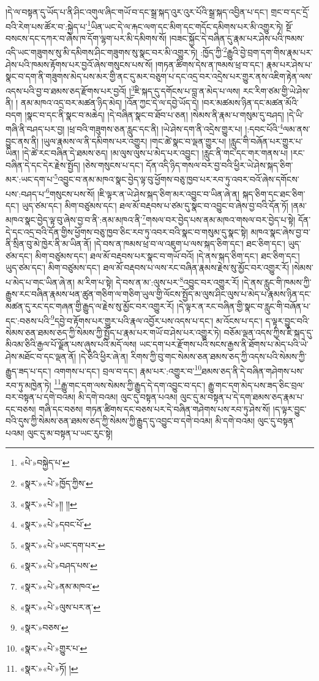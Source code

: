 །དེ་ལ་བསྟན་དུ་ཡོད་པ་ནི་ཤིང་འགུལ་ཞིང་གཡོ་བ་དང་སྒྲ་སྐད་འུར་འུར་པོའི་སྒྲ་སྐད་འབྱིན་པ་དང་། གྲང་བ་དང་དྲོ་བའི་རེག་པས་ཚོར་བ་:སྐྱེད་པ་\footnote{«པེ་»བསྐྱེད་པ་}ཡིན་ཡང་དེ་ལ་རྐང་ལག་དང་མིག་དང་གདོང་དམིགས་པར་མི་འགྱུར་ཏེ། སྔོ་བསངས་དང་དཀར་བ་ཞེས་ཁ་དོག་ལྷག་པར་མི་དམིགས་སོ། །བཟང་སྐྱོང་དེ་བཞིན་དུ་རྣམ་པར་ཤེས་པའི་ཁམས་འདི་ཡང་གཟུགས་སུ་མི་དམིགས་ཤིང་གཟུགས་སུ་སྣང་བར་མི་འགྱུར་ཏེ། :ཁྱོད་ཀྱི་\footnote{«སྣར་»«པེ་»ཁྱོད་ཀྱིས་}རྒྱུའི་བྱེ་བྲག་དག་གིས་རྣམ་པར་ཤེས་པའི་ཁམས་རྟོགས་པར་བྱའོ་ཞེས་གསུངས་པས་སོ། །གཏན་ཚིགས་དེས་ན་ཁམས་ཕྲ་བ་དང་། རྣམ་པར་ཤེས་པ་སྣང་བ་དག་ནི་གཟུགས་མེད་པས་མར་གྱི་ནང་དུ་མར་བཅུག་པ་དང་འདྲ་བར་འདྲེས་པར་གྱུར་ནས་འཇིག་རྟེན་ལས་འདས་པའི་བྱ་བ་ཐམས་ཅད་རྫོགས་པར་བྱའོ། །\footnote{«སྣར་»«པེ་»།། །།}ཇི་སྐད་དུ་དགོངས་པ་བླ་ན་མེད་པ་ལས། རང་རིག་ཙམ་གྱི་ཡེ་ཤེས་ནི། །
ནམ་མཁའ་འདྲ་བར་མཚན་ཉིད་མེད། །འོན་ཀྱང་དེ་ལ་དབྱེ་ཡོད་དེ། །བར་མཚམས་ཉིན་དང་མཚན་མོའི་བདག །སྣང་བ་དང་ནི་སྣང་བ་མཆེད། །དེ་བཞིན་སྣང་བ་ཐོབ་པ་ཅན། །སེམས་ནི་རྣམ་པ་གསུམ་དུ་བཤད། །དེ་ཡི་གཞི་ནི་བཤད་པར་བྱ། །ཕྲ་བའི་གཟུགས་ཅན་རླུང་དང་ནི། །ཡེ་ཤེས་དག་ནི་འདྲེས་གྱུར་པ། །:དབང་པོའི་\footnote{«སྣར་»«པེ་»དབང་པོ་}ལམ་ནས་བྱུང་ནས་ནི། །ཡུལ་རྣམས་ལ་ནི་དམིགས་པར་འགྱུར། །གང་ཚེ་སྣང་བ་ལྡན་གྱུར་པ། །རླུང་གི་བཞོན་པར་གྱུར་པ་ཡིན། །དེ་ཚེ་རང་བཞིན་དེ་ཐམས་ཅད། །མ་ལུས་ལུས་པ་མེད་པར་འབྱུང་། །རླུང་ནི་གང་དང་གར་གནས་པ། །རང་བཞིན་དེ་དང་དེར་རྗེས་སྤྱོད། །ཅེས་གསུངས་པ་དང་། དོན་འདི་ཉིད་གསལ་བར་བྱ་བའི་ཕྱིར་ཡེ་ཤེས་སྐད་ཅིག་མར་:ཡང་དག་པ་\footnote{«སྣར་»«པེ་»ཡང་དག་པར་}འབྱུང་བ་ནམ་མཁའ་སྣང་བྱེད་ལྟ་བུ་ཕྱོགས་བཅུ་ཁྱབ་པར་རབ་ཏུ་འབར་བའོ་ཞེས་དགོངས་པས་:བཤད་པ་\footnote{«སྣར་»«པེ་»བཤད་པས་}གསུངས་པས་སོ། །ཇི་ལྟར་ན་ཡེ་ཤེས་སྐད་ཅིག་མར་འབྱུང་བ་ཡིན་ཞེ་ན། སྐད་ཅིག་དང་ཐང་ཅིག་དང་། ཡུད་ཙམ་དང་། མིག་བཙུམས་དང་། ཐལ་མོ་བརྡབས་པ་ཙམ་དུ་སྣང་བ་འབྱུང་བ་ཞེས་བྱ་བའི་དོན་ཏོ། །ནམ་མཁའ་སྣང་བྱེད་ལྟ་བུ་ཞེས་བྱ་བ་ནི་:ནམ་མཁའ་ནི་\footnote{«སྣར་»«པེ་»ནམ་མཁའ་}གསལ་བར་བྱེད་པས་ནམ་མཁའ་གསལ་བར་བྱེད་པ་སྟེ། དོན་དེ་དང་འདྲ་བའི་དོན་གྱིས་ཕྱོགས་བཅུ་ཁྱབ་ཅིང་རབ་ཏུ་འབར་བའི་སྣང་བ་གསུམ་དུ་སྣང་སྟེ། མཁའ་སྣང་ཞེས་བྱ་བ་ནི་སྲིན་བུ་མེ་ཁྱེར་ནི་མ་ཡིན་ནོ། །དེ་བས་ན་ཁམས་ཕྲ་བ་ལ་འཇུག་པ་ལས་སྐད་ཅིག་དང་། ཐང་ཅིག་དང་། ཡུད་ཙམ་དང་། མིག་བཙུམས་དང་། ཐལ་མོ་བརྡབས་པར་སྣང་བ་གཡོ་བའོ། །དེ་ནས་སྐད་ཅིག་དང་། ཐང་ཅིག་དང་། ཡུད་ཙམ་དང་། མིག་བཙུམས་དང་། ཐལ་མོ་བརྡབས་པ་ལས་རང་བཞིན་རྣམས་རྗེས་སུ་མྱོང་བར་འགྱུར་རོ། །སེམས་པ་མེད་པ་གང་ཡིན་ཞེ་ན། མ་རིག་པ་སྟེ། དེ་བས་ན་མ་:ལུས་པར་\footnote{«སྣར་»«པེ་»ལུས་པར་ན་}འབྱུང་བར་འགྱུར་རོ། །དེ་ནས་རླུང་གི་ཁམས་ཀྱི་རྒྱུས་རང་བཞིན་རྣམས་ཕན་ཚུན་གཅིག་ལ་གཅིག་ཡུལ་གྱི་ལོངས་སྤྱོད་མ་ལུས་ཤིང་ལུས་པ་མེད་པ་རྣམས་ཉིན་དང་མཚན་དུ་རང་དང་གཞན་གྱི་རྒྱུད་ལ་རྗེས་སུ་མྱོང་བར་འགྱུར་རོ། །དེ་ལྟར་ན་རང་བཞིན་གྱི་སྣང་བ་རླུང་གི་བཞོན་པ་དང་:བཅས་པའི་\footnote{«སྣར་»བཅས་}དབྱེ་བ་རྟོགས་པར་གྱུར་པའི་རྣལ་འབྱོར་པས་འདས་པ་དང་། མ་འོངས་པ་དང་། ད་ལྟར་བྱུང་བའི་སེམས་ཅན་ཐམས་ཅད་ཀྱི་སེམས་ཀྱི་སྤྱོད་པ་རྣམ་པར་གཡོ་བ་ཤེས་པར་འགྱུར་ཏེ། བཅོམ་ལྡན་འདས་ཀྱིས་ཇི་སྐད་དུ་མིའམ་ཅིའི་རྒྱལ་པོ་ལྗོན་པས་ཞུས་པའི་མདོ་ལས། ཡང་དག་པར་རྫོགས་པའི་སངས་རྒྱས་ནི་ཐོགས་པ་མེད་པའི་ཡེ་ཤེས་མཐོང་བ་དང་ལྡན་ནོ། །དེ་ཅིའི་ཕྱིར་ཞེ་ན། རིགས་ཀྱི་བུ་གང་སེམས་ཅན་ཐམས་ཅད་ཀྱི་འདས་པའི་སེམས་ཀྱི་རྒྱུད་ཟད་པ་དང་། འགགས་པ་དང་། བྲལ་བ་དང་། རྣམ་པར་:འགྱུར་བ་\footnote{«སྣར་»«པེ་»གྱུར་པ་}ཐམས་ཅད་ནི་དེ་བཞིན་གཤེགས་པས་རབ་ཏུ་མཁྱེན་ཏེ། \footnote{«སྣར་»«པེ་»ཏོ། ། }རྒྱུ་གང་དག་ལས་སེམས་ཀྱི་རྒྱུད་དེ་དག་འབྱུང་བ་དང་། རྒྱུ་གང་དག་མེད་པས་ཟད་ཅིང་བྲལ་བར་བསྟན་པ་དགེ་བའམ། མི་དགེ་བའམ། ལུང་དུ་བསྟན་པའམ། ལུང་དུ་མ་བསྟན་པ་དེ་དག་ཐམས་ཅད་རྣམ་པ་དང་བཅས། གཞི་དང་བཅས། གཏན་ཚིགས་དང་བཅས་པར་དེ་བཞིན་གཤེགས་པས་རབ་ཏུ་ཤེས་སོ། །ད་ལྟར་བྱུང་བའི་དུས་ཀྱི་སེམས་ཅན་ཐམས་ཅད་ཀྱི་སེམས་ཀྱི་རྒྱུད་དུ་འབྱུང་བ་དགེ་བའམ། མི་དགེ་བའམ། ལུང་དུ་བསྟན་པའམ། ལུང་དུ་མ་བསྟན་པ་ཡང་རུང་སྟེ། 